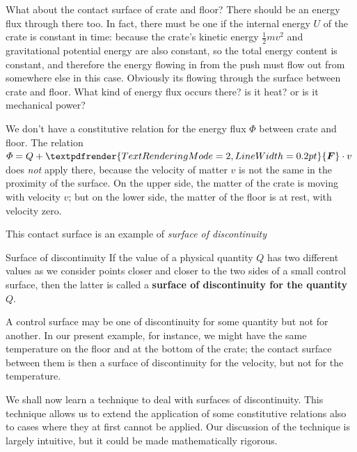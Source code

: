 \documentclass[a4paper,12pt,%
onecolumn,oneside,%
british%
]{memoir}
\renewcommand*{\bm}[1]{\textpdfrender{TextRenderingMode=2,LineWidth=0.2pt}{\boldsymbol{#1}}}
\renewcommand*{\|}[1][]{\nonscript\:#1\vert\nonscript\:\mathopen{}}
\newcommand*{\yM}{m}%
\newcommand*{\yU}{U}
\newcommand*{\yH}{\varPhi}%
\newcommand*{\yQ}{Q}%
\newcommand*{\yF}{\bm{F}}
\begin{document}
What about the contact surface of crate and floor? There should be an energy flux through there too. In fact, there must be one if the internal energy $\yU$ of the crate is constant in time: because the crate's kinetic energy $\tfrac12\yM v^{2}$ and gravitational potential energy are also constant, so the total energy content is constant, and therefore the energy flowing in from the push must flow out from somewhere else in this case. Obviously its flowing through the surface between crate and floor. What kind of energy flux occurs there? is it heat? or is it mechanical power?

We don't have a constitutive relation for the energy flux $\yH$ between crate and floor. The relation $\yH = \yQ + \yF\cdot v$ does \emph{not} apply there, because the velocity of matter $v$ is not the same in the proximity of the surface. On the upper side, the matter of the crate is moving with velocity $v$; but on the lower side, the matter of the floor is at rest, with velocity zero.

This contact surface is an example of \emph{surface of discontinuity}
\begin{definition}{Surface of discontinuity}
If the value of a physical quantity $Q$ has two different values as we consider points closer and closer to the two sides of a small control surface, then the latter is called a \textbf{surface of discontinuity for the quantity $Q$}.
\end{definition}
A control surface may be one of discontinuity for some quantity but not for another. In our present example, for instance, we might have the same temperature on the floor and at the bottom of the crate; the contact surface between them is then a surface of discontinuity for the velocity, but not for the temperature.

\medskip

We shall now learn a technique to deal with surfaces of discontinuity. This technique allows us to extend the application of some constitutive relations also to cases where they at first cannot be applied. Our discussion of the technique is largely intuitive, but it could be made mathematically rigorous.
\end{document}

